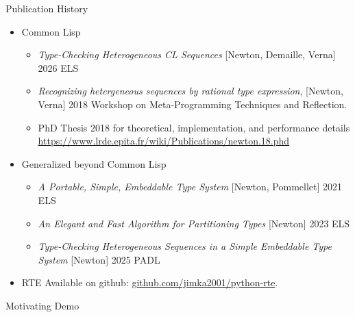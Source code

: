 \begin{frame}{Publication History}
  \begin{itemize}
  \item Common Lisp
    
    \begin{itemize}
    \item \textit{Type-Checking Heterogeneous CL Sequences} [Newton, Demaille, Verna] 2026 ELS
    \item \textit{Recognizing hetergeneous sequences by rational type
      expression}, [Newton, Verna] 2018 Workshop on Meta-Programming
      Techniques and Reflection.
    \item PhD Thesis 2018 for theoretical, implementation, and performance details
      \url{https://www.lrde.epita.fr/wiki/Publications/newton.18.phd}
      
    \end{itemize}
  \item Generalized beyond Common Lisp
    \begin{itemize}
    \item \textit{A Portable, Simple, Embeddable Type System} [Newton, Pommellet] 2021 ELS
      
    \item \textit{An Elegant and Fast Algorithm for Partitioning Types} [Newton] 2023 ELS
    \item \textit{Type-Checking Heterogeneous Sequences in a Simple Embeddable Type System} [Newton] 2025 PADL
    \end{itemize}
  \item   RTE Available on github: \url{github.com/jimka2001/python-rte}.
  \end{itemize}
\end{frame}



\begin{frame}{Motivating Demo}

\end{frame}
